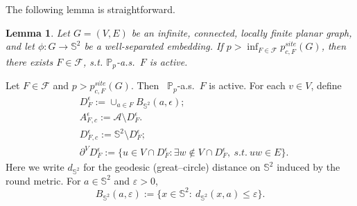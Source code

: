 \documentclass[11pt]{amsart}
\theoremstyle{plain}
\newtheorem{lemma}[theorem]{Lemma}
\numberwithin{equation}{section}
\numberwithin{figure}{section}
\newcommand\PP{{\mathbb P}}
\begin{document}
The following lemma is straightforward.

\begin{lemma}\label{le63}Let $G=(V,E)$ be an infinite, connected, locally finite planar graph, and let
$\phi:G\to\mathbb{S}^2$ be a well-separated embedding. If $p>\inf_{F\in\mathcal{F}}p_{c,F}^{site}(G)$, then there exists $F\in \mathcal{F}$, s.t. $\PP_p$-a.s.~$F$ is active.
\end{lemma}





Let $F\in\mathcal{F}$ and $p>p_{c,F}^{site}(G)$. Then ~$\PP_p$-a.s.~$F$ is active. For each $v\in V$, define 
\begin{align*}
&D_F^{\epsilon}:=\cup_{a\in F}B_{\mathbb{S}^2}(a,\epsilon);\\ 
&A_{F,c}^{\epsilon}:=\mathcal{A}\setminus D_F^{\epsilon}.\\
&D_{F,c}^{\epsilon}:=\mathbb{S}^2\setminus D_F^{\epsilon};\\
&\partial^V D_F^{\epsilon}:=\{u\in V\cap D_{F}^{\epsilon}:\exists w\notin V\cap D_{F}^{\epsilon},~s.t.~uw\in E\}.
\end{align*}
Here we write $d_{\mathbb{S}^2}$ for the geodesic (great–circle) distance on $\mathbb{S}^2$ induced by
the round metric. For $a\in\mathbb{S}^2$ and $\varepsilon>0$,
\[
B_{\mathbb{S}^2}(a,\varepsilon)
:=\{x\in\mathbb{S}^2:\ d_{\mathbb{S}^2}(x,a)\le \varepsilon\}.
\]
\end{document}
